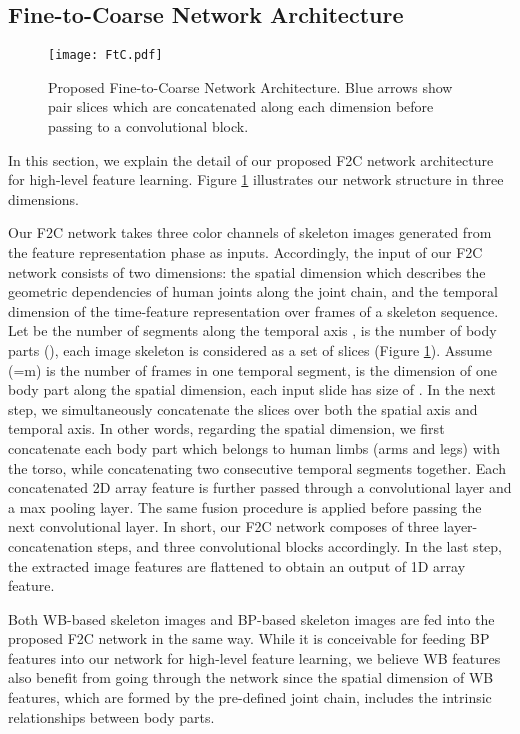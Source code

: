 \documentclass{bmvc2k}
\begin{document}
\subsection{Fine-to-Coarse Network Architecture}
\begin{figure}[t!]
	\centering
	\texttt{[image: FtC.pdf]}
	\caption{Proposed Fine-to-Coarse Network Architecture. Blue arrows show pair slices which are concatenated along each dimension before passing to a convolutional block.}
	\label{fig:hier_arch}
\end{figure}
In this section, we explain the detail of our proposed F2C network architecture for high-level feature learning. Figure \ref{fig:hier_arch} illustrates our network structure in three dimensions.

Our F2C network takes three color channels of skeleton images generated from the feature representation phase as inputs. Accordingly, the input of our F2C network consists of two dimensions: the spatial dimension which describes the geometric dependencies of human joints along the joint chain, and the temporal dimension of the time-feature representation over  frames of a skeleton sequence. Let  be the number of segments along the temporal axis ,  is the number of body parts (), each image skeleton is considered as a set of  slices (Figure \ref{fig:hier_arch}). Assume  (=m) is the number of frames in one temporal segment,  is the dimension of one body part along the spatial dimension, each input slide has size of . In the next step, we simultaneously concatenate the slices over both the spatial axis and temporal axis. In other words, regarding the spatial dimension, we first concatenate each body part which belongs to human limbs (arms and legs) with the torso, while concatenating two consecutive temporal segments together. Each concatenated 2D array feature is further passed through a convolutional layer and a max pooling layer. The same fusion procedure is applied before passing the next convolutional layer. In short, our F2C network composes of three layer-concatenation steps, and three convolutional blocks accordingly. In the last step, the extracted image features are flattened to obtain an output of 1D array feature.

Both WB-based skeleton images and BP-based skeleton images are fed into the proposed F2C network in the same way. While it is conceivable for feeding BP features into our network for high-level feature learning, we believe WB features also benefit from going through the network since the spatial dimension of WB features, which are formed by the pre-defined joint chain, includes the intrinsic relationships between body parts. 
\end{document}
